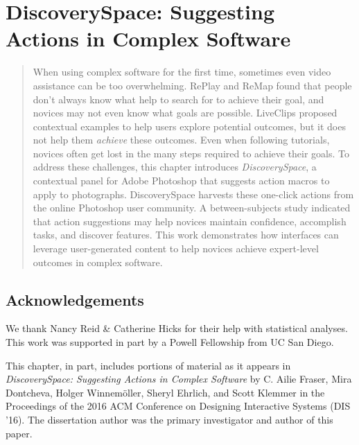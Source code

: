 \chapter{DiscoverySpace: Suggesting Actions in Complex Software}
\label{chapter:discoveryspace}
\begin{quote}
When using complex software for the first time, sometimes even video assistance can be too overwhelming. RePlay and ReMap found that people don't always know what help to search for to achieve their goal, and novices may not even know what goals are possible. LiveClips proposed contextual examples to help users explore potential outcomes, but it does not help them \textit{achieve} these outcomes. Even when following tutorials, novices often get lost in the many steps required to achieve their goals. To address these challenges, this chapter introduces \textit{Discovery\-Space}, a contextual panel for Adobe Photoshop that suggests action macros to apply to photographs. Discovery\-Space harvests these one-click actions from the online Photoshop user community. A between-subjects study indicated that action suggestions may help novices maintain confidence, accomplish tasks, and discover features. This work demonstrates how interfaces can leverage user-generated content to help novices achieve expert-level outcomes in complex software.
\end{quote}











\section{Acknowledgements}
We thank Nancy Reid \& Catherine Hicks for their help with statistical analyses. This work was supported in part by a Powell Fellowship from UC San Diego.

This chapter, in part, includes portions of material as it appears in \textit{DiscoverySpace: Suggesting Actions in Complex Software} by C. Ailie Fraser, Mira Dontcheva, Holger Winnemöller, Sheryl Ehrlich, and Scott Klemmer in the Proceedings of the 2016 ACM Conference on Designing Interactive Systems (DIS '16). The dissertation author was the primary investigator and author of this paper.